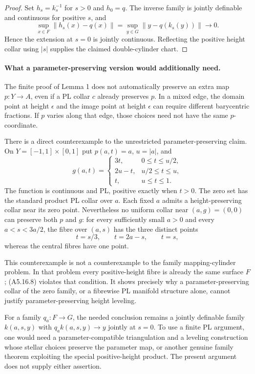 \begin{proof}
Set $h_s=k_s^{-1}$ for $s>0$ and $h_0=q$. The inverse family is jointly
definable and continuous for positive $s$, and
\[
 \sup_{x\in F}\|h_s(x)-q(x)\|
 =\sup_{y\in G}\|y-q(k_s(y))\|\longrightarrow0.
\]
Hence the extension at $s=0$ is jointly continuous. Reflecting the positive
height collar using $|s|$ supplies the claimed double-cylinder chart.
\end{proof}

\paragraph{What a parameter-preserving version would additionally need.}
The finite proof of Lemma 1 does not automatically preserve an extra map
$p:Y\to A$, even if a PL collar $c$ already preserves $p$. In a mixed edge,
the domain point at height $\epsilon$ and the image point at height
$\epsilon$ can require different barycentric fractions. If $p$ varies
along that edge, those choices need not have the same $p$-coordinate.

There is a direct counterexample to the unrestricted parameter-preserving
claim. On $Y=[-1,1]\times[0,1]$ put $p(a,t)=a$, $u=|a|$, and
\[
 g(a,t)=
 \begin{cases}
 3t,&0\le t\le u/2,\\
 2u-t,&u/2\le t\le u,\\
 t,&u\le t\le1.
 \end{cases}
 \tag{A5.16.8}
\]
The function is continuous and PL, positive exactly when $t>0$. The zero
set has the standard product PL collar over $a$. Each fixed $a$ admits
a height-preserving collar near its zero point. Nevertheless no uniform
collar near $(a,g)=(0,0)$ can preserve both $p$ and $g$: for every sufficiently
small $a>0$ and every $a<s<3a/2$, the fibre over $(a,s)$ has the three
distinct points
\[
 t=s/3,\qquad t=2a-s,\qquad t=s,
\]
whereas the central fibres have one point.

This counterexample is not a counterexample to the family mapping-cylinder
problem. In that problem every positive-height fibre is already the same
surface $F$; (A5.16.8) violates that condition. It shows precisely why a
parameter-preserving collar of the zero family, or a fibrewise PL manifold
structure alone, cannot justify parameter-preserving height leveling.

For a family $q_a:F\to G$, the needed conclusion remains a jointly definable
family $k(a,s,y)$ with $q_a k(a,s,y)\to y$ jointly at $s=0$. To use a finite
PL argument, one would need a parameter-compatible triangulation and a
leveling construction whose stellar choices preserve the parameter map, or
another genuine family theorem exploiting the special positive-height
product. The present argument does not supply either assertion.


